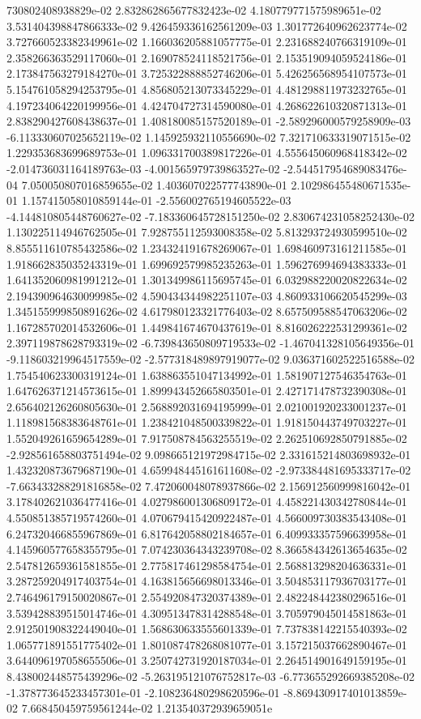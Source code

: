 730802408938829e-02	2.832862865677832423e-02	4.180779771575989651e-02	3.531404398847866333e-02	9.426459336162561209e-03	1.301772640962623774e-02	3.727660523382349961e-02	1.166036205881057775e-01	2.231688240766319109e-01	2.358266363529117060e-01	2.169078524118521756e-01	2.153519094059524186e-01	2.173847563279184270e-01	3.725322888852746206e-01	5.426256568954107573e-01	5.154761058294253795e-01	4.856805213073345229e-01	4.481298811973232765e-01	4.197234064220199956e-01	4.424704727314590080e-01	4.268622610320871313e-01	2.838290427608438637e-01	1.408180085157520189e-01	-2.589296000579258909e-03	-6.113330607025652119e-02	1.145925932110556690e-02	7.321710633319071515e-02	1.229353683699689753e-01	1.096331700389817226e-01	4.555645060968418342e-02	-2.014736031164189763e-03	-4.001565979739863527e-02	-2.544517954689083476e-04	7.050050807016859655e-02	1.403607022577743890e-01	2.102986455480671535e-01	1.157415058010859144e-01	-2.556002765194605522e-03	-4.144810805448760627e-02	-7.183360645728151250e-02	2.830674231058252430e-02	1.130225114946762505e-01	7.928755112593008358e-02	5.813293724930599510e-02	8.855511610785432586e-02	1.234324191678269067e-01	1.698460973161211585e-01	1.918662835035243319e-01	1.699692579985235263e-01	1.596276994694383333e-01	1.641352060981991212e-01	1.301349986115695745e-01	6.032988220020822634e-02	2.194390964630099985e-02	4.590434344982251107e-03	4.860933106620545299e-03	1.345155999850891626e-02	4.617980123321776403e-02	8.657509588547063206e-02	1.167285702014532606e-01	1.449841674670437619e-01	8.816026222531299361e-02	2.397119878628793319e-02	-6.739843650809719533e-02	-1.467041328105649356e-01	-9.118603219964517559e-02	-2.577318489897919077e-02	9.036371602522516588e-02	1.754540623300319124e-01	1.638863551047134992e-01	1.581907127546354763e-01	1.647626371214573615e-01	1.899943452665803501e-01	2.427171478732390308e-01	2.656402126260805630e-01	2.568892031694195999e-01	2.021001920233001237e-01	1.118981568383648761e-01	1.238421048500339822e-01	1.918150443749703227e-01	1.552049261659654289e-01	7.917508784563255519e-02	2.262510692850791885e-02	-2.928561658803751494e-02	9.098665121972984715e-02	2.331615214803698932e-01	1.432320873679687190e-01	4.659948445161611608e-02	-2.973384481695333717e-02	-7.663433288291816858e-02	7.472060048078937866e-02	2.156912560999816042e-01	3.178402621036477416e-01	4.027986001306809172e-01	4.458221430342780844e-01	4.550851385719574260e-01	4.070679415420922487e-01	4.566009730383543408e-01	6.247320466855967869e-01	6.817642058802184657e-01	6.409933357596639958e-01	4.145960577658355795e-01	7.074230364343239708e-02	8.366584342613654635e-02	2.547812659361581855e-01	2.775817461298584754e-01	2.568813298204636331e-01	3.287259204917403754e-01	4.163815656698013346e-01	3.504853117936703177e-01	2.746496179150020867e-01	2.554920847320374389e-01	2.482248442380296516e-01	3.539428839515014746e-01	4.309513478314288548e-01	3.705979045014581863e-01	2.912501908322449040e-01	1.568630633555601339e-01	7.737838142215540393e-02	1.065771891551775402e-01	1.801087478268081077e-01	3.157215037662890467e-01	3.644096197058655506e-01	3.250742731920187034e-01	2.264514901649159195e-01	8.438002448575439296e-02	-5.263195121076752817e-03	-6.773655292669385208e-02	-1.378773645233457301e-01	-2.108236480298620596e-01	-8.869430917401013859e-02	7.668450459759561244e-02	1.213540372939659051e